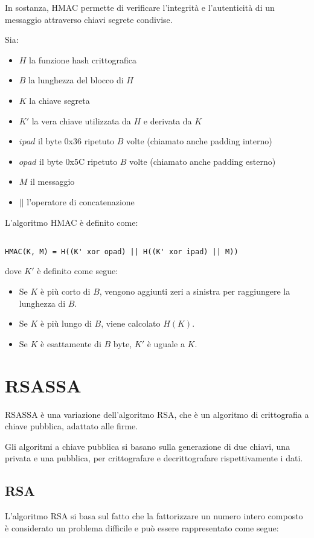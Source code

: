 \documentclass{article}
\begin{document}
In sostanza, HMAC permette di verificare l'integrità e l'autenticità di un messaggio attraverso chiavi segrete condivise.

Sia:
\begin{itemize}
	\item $H$ la funzione hash crittografica
	\item $B$ la lunghezza del blocco di $H$
	\item $K$ la chiave segreta
	\item $K'$ la vera chiave utilizzata da $H$ e derivata da $K$
	\item $ipad$ il byte 0x36 ripetuto $B$ volte (chiamato anche padding interno)
	\item $opad$ il byte 0x5C ripetuto $B$ volte (chiamato anche padding esterno)
	\item $M$ il messaggio
	\item $||$ l'operatore di concatenazione
\end{itemize}

L'algoritmo HMAC è definito come:
\begin{verbatim}

HMAC(K, M) = H((K' xor opad) || H((K' xor ipad) || M))

\end{verbatim}
dove $K'$ è definito come segue:
\begin{itemize}
	\item Se $K$ è più corto di $B$, vengono aggiunti zeri a sinistra per raggiungere la lunghezza di $B$.
	\item Se $K$ è più lungo di $B$, viene calcolato $H(K)$.
	\item Se $K$ è esattamente di $B$ byte, $K'$ è uguale a $K$.
\end{itemize}


\section{RSASSA}
RSASSA è una variazione dell'algoritmo RSA, che è un algoritmo di crittografia a chiave pubblica, adattato alle firme.

Gli algoritmi a chiave pubblica si basano sulla generazione di due chiavi, una privata e una pubblica, per crittografare e decrittografare rispettivamente i dati.

\subsection{RSA}
L'algoritmo RSA si basa sul fatto che la fattorizzare un numero intero composto è considerato un problema difficile e può essere rappresentato come segue:
\end{document}

